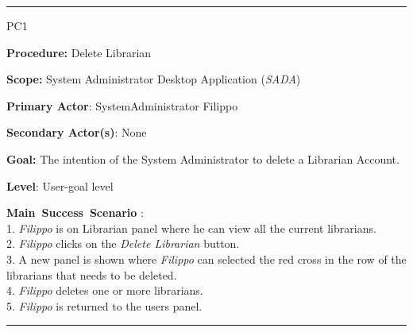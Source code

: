 \vspace{0.5cm}
\hrule
\begin{lyxlist}{PC1}
\small{
\item [\textbf{Procedure:}] Delete Librarian
\item [\textbf{Scope:}] System Administrator Desktop Application (\emph{SADA})
\item [\textbf{Primary Actor}:] SystemAdministrator Filippo
\item [\textbf{Secondary Actor(s)}:] None
\item [\textbf{Goal:}] The intention of the System Administrator to
delete a Librarian Account.
\item [\textbf{Level}:] User-goal level
\item [\textbf{Main~Success~Scenario}]:\\
1. \emph{Filippo} is on Librarian panel where he can view all the current
librarians.
\\
2. \emph{Filippo} clicks on the \emph{Delete Librarian} button. \\
3. A new panel is shown where \emph{Filippo} can selected the red cross in
the row of the librarians that needs to be deleted.
\\
4. \emph{Filippo} deletes one or more librarians. 
\\
5. \emph{Filippo} is returned to the users panel. \\
}
\end{lyxlist}
\hrule